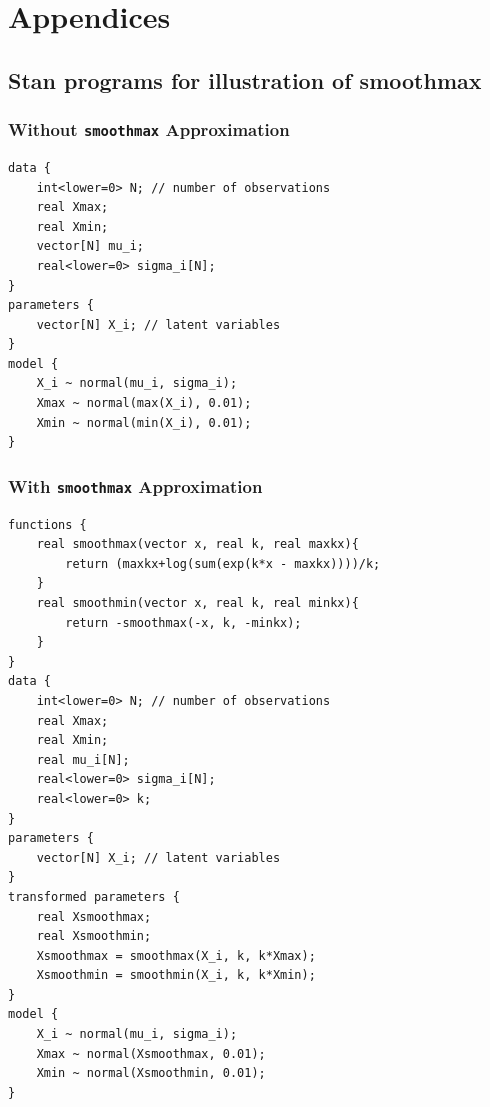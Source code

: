 \documentclass[letter]{article}
\begin{document}
        \section{Appendices}\label{appendices}

\subsection{Stan programs for illustration of smoothmax}\label{stan-programs-for-illustration-of-smoothmax}
    

\label{sec:stan_illustration}
        \subsubsection{\texorpdfstring{Without \texttt{smoothmax} Approximation}{Without smoothmax Approximation}}\label{without-smoothmax-approximation}
    


        \begin{verbatim}
data {
    int<lower=0> N; // number of observations
    real Xmax;
    real Xmin;
    vector[N] mu_i;
    real<lower=0> sigma_i[N];
}
parameters {
    vector[N] X_i; // latent variables
}
model {
    X_i ~ normal(mu_i, sigma_i);
    Xmax ~ normal(max(X_i), 0.01);
    Xmin ~ normal(min(X_i), 0.01);
}
\end{verbatim}
    


        \subsubsection{\texorpdfstring{With \texttt{smoothmax} Approximation}{With smoothmax Approximation}}\label{with-smoothmax-approximation}
    


        \begin{verbatim}
functions {
    real smoothmax(vector x, real k, real maxkx){
        return (maxkx+log(sum(exp(k*x - maxkx))))/k;
    }
    real smoothmin(vector x, real k, real minkx){
        return -smoothmax(-x, k, -minkx);
    }
}
data {
    int<lower=0> N; // number of observations
    real Xmax;
    real Xmin;
    real mu_i[N];
    real<lower=0> sigma_i[N];
    real<lower=0> k;
}
parameters {
    vector[N] X_i; // latent variables
}
transformed parameters {
    real Xsmoothmax;
    real Xsmoothmin;
    Xsmoothmax = smoothmax(X_i, k, k*Xmax);
    Xsmoothmin = smoothmin(X_i, k, k*Xmin);
}
model {
    X_i ~ normal(mu_i, sigma_i);
    Xmax ~ normal(Xsmoothmax, 0.01);
    Xmin ~ normal(Xsmoothmin, 0.01);
}
\end{verbatim}
    
\end{document}
